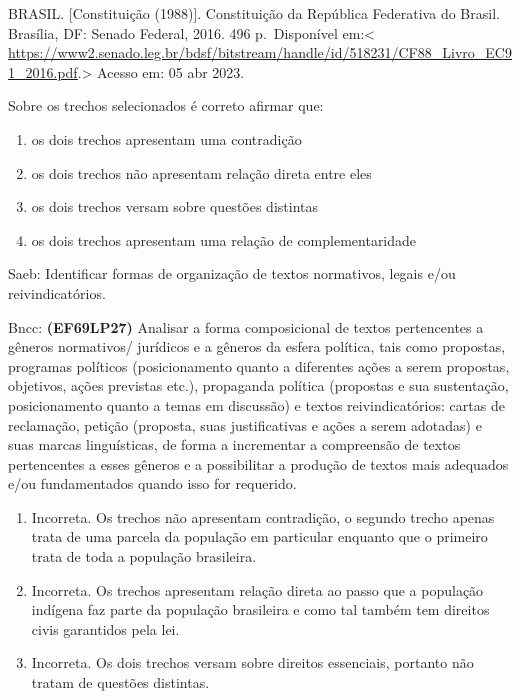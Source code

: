 BRASIL. {[}Constituição (1988){]}. Constituição da República Federativa
do Brasil. Brasília, DF: Senado Federal, 2016. 496 p.~Disponível
em:\textless{}
\href{https://www2.senado.leg.br/bdsf/bitstream/handle/id/518231/CF88_Livro_EC91_2016.pdf}{\uline{https://www2.senado.leg.br/bdsf/bitstream/handle/id/518231/CF88\_Livro\_EC91\_2016.pdf}}.\textgreater{}
Acesso em: 05 abr 2023.

Sobre os trechos selecionados é correto afirmar que:

\begin{enumerate}
\def\labelenumi{\alph{enumi})}
\item
  os dois trechos apresentam uma contradição
\item
  os dois trechos não apresentam relação direta entre eles
\item
  os dois trechos versam sobre questões distintas
\item
  os dois trechos apresentam uma relação de complementaridade
\end{enumerate}

Saeb: Identificar formas de organização de textos normativos, legais
e/ou reivindicatórios.

Bncc: \textbf{(EF69LP27)} Analisar a forma composicional de textos
pertencentes a gêneros normativos/ jurídicos e a gêneros da esfera
política, tais como propostas, programas políticos (posicionamento
quanto a diferentes ações a serem propostas, objetivos, ações previstas
etc.), propaganda política (propostas e sua sustentação, posicionamento
quanto a temas em discussão) e textos reivindicatórios: cartas de
reclamação, petição (proposta, suas justificativas e ações a serem
adotadas) e suas marcas linguísticas, de forma a incrementar a
compreensão de textos pertencentes a esses gêneros e a possibilitar a
produção de textos mais adequados e/ou fundamentados quando isso for
requerido.

\begin{enumerate}
\def\labelenumi{\arabic{enumi}.}
\item
  Incorreta. Os trechos não apresentam contradição, o segundo trecho
  apenas trata de uma parcela da população em particular enquanto que o
  primeiro trata de toda a população brasileira.
\item
  Incorreta. Os trechos apresentam relação direta ao passo que a
  população indígena faz parte da população brasileira e como tal também
  tem direitos civis garantidos pela lei.
\item
  Incorreta. Os dois trechos versam sobre direitos essenciais, portanto
  não tratam de questões distintas.
\end{enumerate}

